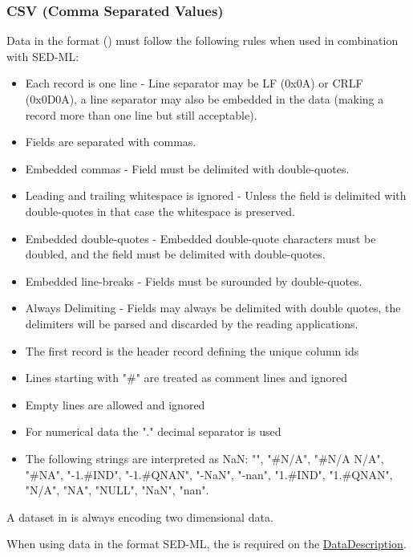 \subsubsection{CSV (Comma Separated Values)}
\label{sec:dataFormatCSV}
Data in the  format () must follow the following rules when used in combination with SED-ML: 

\begin{itemize}
	\item Each record is one line - Line separator may be LF (0x0A) or CRLF (0x0D0A), a line separator may also be embedded in the data (making a record more than one line but still acceptable).
    \item Fields are separated with commas.
    \item Embedded commas - Field must be delimited with double-quotes.
    \item Leading and trailing whitespace is ignored - Unless the field is delimited with double-quotes in that case the whitespace is preserved.
    \item Embedded double-quotes - Embedded double-quote characters must be doubled, and the field must be delimited with double-quotes.
    \item Embedded line-breaks - Fields must be surounded by double-quotes.
    \item Always Delimiting - Fields may always be delimited with double quotes, the delimiters will be parsed and discarded by the reading applications.
	\item The first record is the header record defining the unique column ids 
	\item Lines starting with "\#" are treated as comment lines and ignored
	\item Empty lines are allowed and ignored
	\item For numerical data the "." decimal separator is used
	\item The following strings are interpreted as NaN: "", "\#N/A", "\#N/A N/A", "\#NA", "-1.\#IND", "-1.\#QNAN", "-NaN", "-nan", "1.\#IND", "1.\#QNAN", "N/A", "NA", "NULL", "NaN", "nan".
\end{itemize}

A dataset in  is always encoding two dimensional data. 

When using data in the  format  SED-ML, the \hyperref[sec:dimensionDescription]{} is required on the \hyperref[class:dataDescription]{DataDescription}. 

